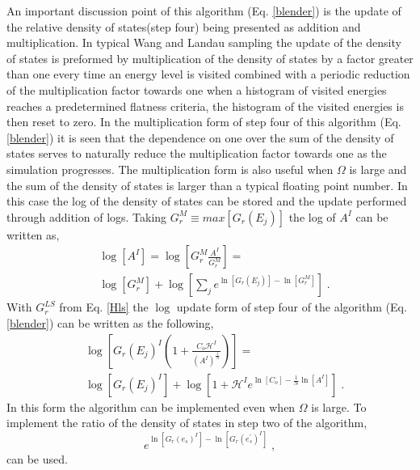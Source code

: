 \documentclass[aps,pre,reprint,superscriptaddress,showkeys]{revtex4-1}
\begin{document}
 


An important discussion point of this algorithm (Eq. \ref{blender}) is the update of the relative density of states(step four) being presented as addition and multiplication.
 In  typical Wang and Landau sampling the update of the density of states is preformed by multiplication of the density of states by a factor greater than one every time an energy level is visited combined with a periodic reduction of the multiplication factor towards one when a histogram of visited energies reaches a predetermined flatness criteria, the histogram of the visited energies is then reset to zero. In the multiplication form of step four of this algorithm (Eq. \ref{blender}) it is seen that the dependence on one over the sum of the density of states serves to naturally reduce the multiplication factor towards one as the simulation progresses. The multiplication form is also useful when $\Omega$ is large and the sum of the density of states is larger than a typical floating point number. In this case the log of the density of states can be stored and the update performed through addition of logs. Taking $G_{r}^M \equiv  max[G_{r}(E_j)]$ the log of $A^{I}$ can be written as, 
\begin{equation}
\begin{split}
& \log[A^{I}] = \log[G_{r}^M \frac{A^{I}}{G_{r}^M}]=\\
&\log[G_{r}^M] + \log[\sum_j e^{\ln[G_{r}(E_j)] - \ln[G_{r}^M]} ] \;.
\end{split}
\label{Hls}
\end{equation} 
With $G_r^{LS}$ from Eq. \ref{Hls} the $\log$ update form of step four of the algorithm (Eq. \ref{blender}) can be written as the following, 
\begin{equation}
\begin{split}
& \log[ G_{r}(E_j)^{I}( 1 +  \frac{C_o \mathcal{H}^I }{ (A^{I})^{\frac{1}{N} } } ) ]=\\
& \log[ G_{r}(E_j)^{I} ] + \log[1 +   \mathcal{H}^Ie^{\ln[C_o]-\frac{1}{N}\ln[A^{I}]}] \;.
\end{split}
\end{equation}
In this form  the algorithm can be implemented even when $\Omega$ is large. To implement the ratio of the density of states in step two of the algorithm, 
\begin{equation}
e^{\ln[G_{r}(e_s)^{I}] - \ln[G_{r}(e_s^{'})^{I}]} \;,
\end{equation}
can be used.

 
\end{document}
